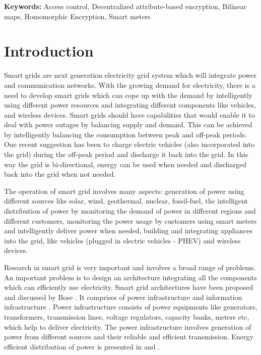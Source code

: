 \documentclass[conference]{IEEEtran}[10pt]
\begin{document}
{\bf Keywords:} Access control, Decentralized attribute-based encryption, Bilinear maps, Homomorphic Encryption, Smart meters


\section{Introduction}
\label{sec:intro}
Smart grids are next generation electricity grid system which will integrate power and communication networks. 
With the growing demand for electricity, there is a need to develop smart grids which can cope up with the demand
by intelligently using different power resources and integrating different components like vehicles, and wireless devices. 
Smart grids should have capabilities that would enable it to deal with power outages by balancing supply and demand.
This can be achieved by intelligently balancing the consumption between peak and off-peak periods. 
One recent suggestion has been to charge electric vehicles (also incorporated into the grid) during the off-peak period and
discharge it back into the grid. In this way the grid is bi-directional, energy can be used when needed and discharged back
into the grid when not needed. 

The operation of smart grid involves many aspects:
generation of power using different sources like solar, wind, geothermal, nuclear, fossil-fuel, 
the intelligent distribution of power by monitoring the demand of power in different regions and different customers,
monitoring the power usage by customers using smart meters and intelligently deliver power when needed, 
building and integrating appliances into the grid, like vehicles (plugged in electric vehicles - PHEV) and wireless devices. 

Research in smart grid is very important and involves a broad range of problems. 
An important problem is to design an architecture integrating all the components which can efficiently use electricity.
Smart grid architectures have been proposed and discussed by Bose \cite{B10}.  
It comprises of power infrastructure and information infrastructure \cite{KTKL10}. 
Power infrastructure consists of power equipments like generators, transformers, transmission lines, voltage regulators, capacity banks, meters etc, 
which help to  deliver electricity. 
The power infrastructure involves generation of power from different sources and their reliable and efficient transmission. 
Energy efficient distribution of power is presented in \cite{WYJ09} and \cite{MMD10}. 
\end{document}
